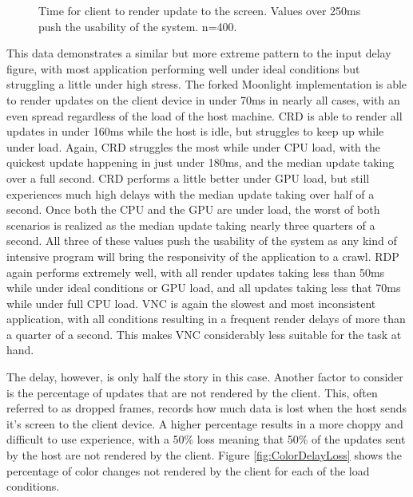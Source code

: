 \begin{figure}[h]
  \caption[Color Delay Data]{Time for client to render update to the screen. Values over 250ms push the usability of the system. n=400.}
  \label{fig:ColorDelay}
\end{figure}

This data demonstrates a similar but more extreme pattern to the input delay figure, with most application performing well under ideal conditions but struggling a little under high stress.
The forked Moonlight implementation is able to render updates on the client device in under 70ms in nearly all cases, with an even spread regardless of the load of the host machine.
CRD is able to render all updates in under 160ms while the host is idle, but struggles to keep up while under load.
Again, CRD struggles the most while under CPU load, with the quickest update happening in just under 180ms, and the median update taking over a full second.
CRD performs a little better under GPU load, but still experiences much high delays with the median update taking over half of a second.
Once both the CPU and the GPU are under load, the worst of both scenarios is realized as the median update taking nearly three quarters of a second.
All three of these values push the usability of the system as any kind of intensive program will bring the responsivity of the application to a crawl.
RDP again performs extremely well, with all render updates taking less than 50ms while under ideal conditions or GPU load, and all updates taking less that 70ms while under full CPU load.
VNC is again the slowest and most inconsistent application, with all conditions resulting in a frequent render delays of more than a quarter of a second.
This makes VNC considerably less suitable for the task at hand.

The delay, however, is only half the story in this case.
Another factor to consider is the percentage of updates that are not rendered by the client.
This, often referred to as dropped frames, records how much data is lost when the host sends it's screen to the client device.
A higher percentage results in a more choppy and difficult to use experience, with a 50\% loss meaning that 50\% of the updates sent by the host are not rendered by the client.
Figure \ref{fig:ColorDelayLoss} shows the percentage of color changes not rendered by the client for each of the load conditions.

